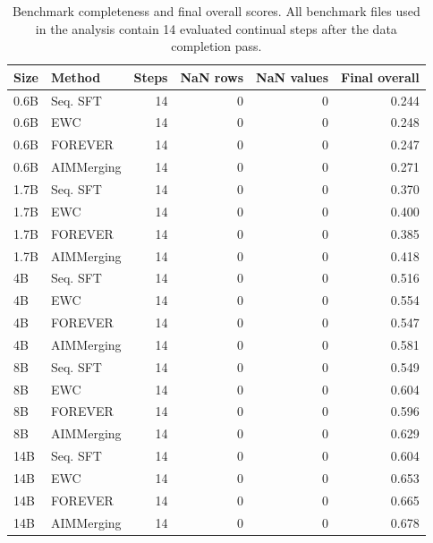\documentclass{article}
\begin{document}
\begin{table}[!htbp]
  \centering
  \caption{
  {Benchmark completeness and final overall scores.}
  All benchmark files used in the analysis contain 14 evaluated continual steps after the data completion pass.
  }
  \label{tab:app_benchmark_quality}
  \footnotesize
  \setlength{\tabcolsep}{4pt}
{
\renewcommand{\arraystretch}{1.05}
\begin{tabular}{llrrrr}
\toprule[0.9pt]
\rowcolor{sizeBand}
Size & Method & Steps & NaN rows & NaN values & Final overall \\
\midrule
\rowcolor{refGray} 0.6B & Seq. SFT & 14 & 0 & 0 & 0.244 \\
\rowcolor{refGray} 0.6B & EWC & 14 & 0 & 0 & 0.248 \\
\rowcolor{refGray} 0.6B & FOREVER & 14 & 0 & 0 & 0.247 \\
\rowcolor{mergeBlue} 0.6B & AIMMerging & 14 & 0 & 0 & 0.271 \\
\midrule
\rowcolor{refGray} 1.7B & Seq. SFT & 14 & 0 & 0 & 0.370 \\
\rowcolor{refGray} 1.7B & EWC & 14 & 0 & 0 & 0.400 \\
\rowcolor{refGray} 1.7B & FOREVER & 14 & 0 & 0 & 0.385 \\
\rowcolor{mergeBlue} 1.7B & AIMMerging & 14 & 0 & 0 & 0.418 \\
\midrule
\rowcolor{refGray} 4B & Seq. SFT & 14 & 0 & 0 & 0.516 \\
\rowcolor{refGray} 4B & EWC & 14 & 0 & 0 & 0.554 \\
\rowcolor{refGray} 4B & FOREVER & 14 & 0 & 0 & 0.547 \\
\rowcolor{mergeBlue} 4B & AIMMerging & 14 & 0 & 0 & 0.581 \\
\midrule
\rowcolor{refGray} 8B & Seq. SFT & 14 & 0 & 0 & 0.549 \\
\rowcolor{refGray} 8B & EWC & 14 & 0 & 0 & 0.604 \\
\rowcolor{refGray} 8B & FOREVER & 14 & 0 & 0 & 0.596 \\
\rowcolor{mergeBlue} 8B & AIMMerging & 14 & 0 & 0 & 0.629 \\
\midrule
\rowcolor{refGray} 14B & Seq. SFT & 14 & 0 & 0 & 0.604 \\
\rowcolor{refGray} 14B & EWC & 14 & 0 & 0 & 0.653 \\
\rowcolor{refGray} 14B & FOREVER & 14 & 0 & 0 & 0.665 \\
\rowcolor{mergeBlue} 14B & AIMMerging & 14 & 0 & 0 & 0.678 \\
\bottomrule[0.9pt]
\end{tabular}
}

\end{table}
\end{document}
